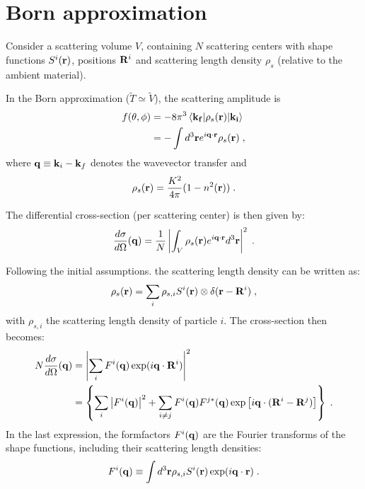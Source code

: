 \section{Born approximation} \label{sec:ba}

Consider a scattering volume $V$, containing $N$ scattering centers with shape functions $S^i(\mathbf{r})$, positions $\mathbf{R}^i$ and scattering length density $\rho_s$ (relative to the ambient material).

In the Born approximation ($\widetilde{T}\simeq\widetilde{V}$), the scattering amplitude is
\begin{align*}
  f(\theta, \phi) & = -8\pi^3 \left\langle \mathbf{k_f} \vert \rho_s(\mathbf{r}) \vert \mathbf{k_i} \right\rangle \nonumber \\
  & = -\int d^3\mathbf{r} e^{i\mathbf{q}\cdot\mathbf{r}} \rho_s(\mathbf{r}) \; ,
\end{align*}
where $\mathbf{q}\equiv \mathbf{k}_i - \mathbf{k}_f$ denotes the wavevector transfer and
\begin{equation*}
  \rho_s(\mathbf{r}) = \frac{K^2}{4\pi}(1-n^2(\mathbf{r})) \; .
\end{equation*}

The differential cross-section (per scattering center) is then given by:
\begin{equation*}
  \frac{d\sigma}{d\Omega}(\mathbf{q}) = \frac{1}{N}\left\lvert \int_V \rho_s(\mathbf{r}) e^{i\mathbf{q}\cdot\mathbf{r}} d^3\mathbf{r} \right\rvert ^2 \; .
\end{equation*}

Following the initial assumptions. the scattering length density can be written as:
\begin{equation*}
\rho_s(\mathbf{r}) = \sum_i \rho_{s,i} S^i(\mathbf{r}) \otimes \delta (\mathbf{r}-\mathbf{R}^i) \; ,
\end{equation*}
with $\rho_{s,i}$ the scattering length density of particle $i$. The cross-section then becomes:
\begin{align*}
  N\frac{d\sigma}{d\Omega}(\mathbf{q}) & = \left\lvert \sum_i F^i(\mathbf{q}) \exp (i\mathbf{q}\cdot\mathbf{R}^i) \right\rvert ^2  \\
  & = \left\lbrace \sum_i \left\lvert F^i(\mathbf{q}) \right\rvert ^2 + \sum_{i\neq j} F^i(\mathbf{q}) F^{j*}(\mathbf{q}) \exp \left[i\mathbf{q}\cdot (\mathbf{R}^i-\mathbf{R}^j)\right] \right\rbrace \; .
\end{align*}
In the last expression, the formfactors $F^i(\mathbf{q})$ are the Fourier transforms of the shape functions, including their scattering length densities:
\begin{equation*}
  F^i(\mathbf{q}) \equiv \int d^3\mathbf{r} \rho_{s,i} S^i(\mathbf{r}) \exp (i\mathbf{q}\cdot\mathbf{r} ) \; .
\end{equation*}

